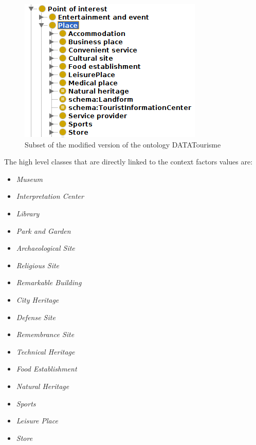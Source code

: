 \begin{figure}[h]
\centering
\includegraphics[scale=0.5]{ontology.png}
\caption{Subset of the modified version of the ontology DATATourisme
}
\label{fig:ontology}
\end{figure}

The high level classes that are directly linked to the context factors values are:
\begin{itemize}
    \item \textit{Museum}
    \item \textit{Interpretation Center}
    \item \textit{Library}
    \item \textit{Park and Garden}
    \item \textit{Archaeological Site}
    \item \textit{Religious Site}
    \item \textit{Remarkable Building}
    \item \textit{City Heritage}
    \item \textit{Defense Site}
    \item \textit{Remembrance Site}
    \item \textit{Technical Heritage}
    \item \textit{Food Establishment}
    \item \textit{Natural Heritage}
    \item \textit{Sports}
    \item \textit{Leisure Place}
    \item \textit{Store}
\end{itemize}

